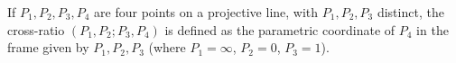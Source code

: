 If $P_1, P_2, P_3, P_4$ are four points on a projective line, with $P_1, P_2, P_3$ distinct, the cross-ratio $(P_1, P_2; P_3, P_4)$ is defined as the parametric coordinate of $P_4$ in the frame given by $P_1, P_2, P_3$ (where $P_1 = \infty$, $P_2 = 0$, $P_3 = 1$).
